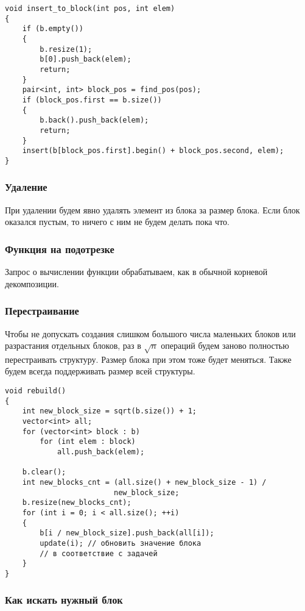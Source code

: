 \begin{verbatim}
void insert_to_block(int pos, int elem)
{
    if (b.empty())
    {
        b.resize(1);
        b[0].push_back(elem);
        return;
    }
    pair<int, int> block_pos = find_pos(pos);
    if (block_pos.first == b.size())
    {
        b.back().push_back(elem);
        return;
    }
    insert(b[block_pos.first].begin() + block_pos.second, elem);
}
\end{verbatim}

\subsubsection{Удаление}

При удалении будем явно удалять элемент из блока за размер блока. Если блок оказался пустым, то ничего с ним не будем делать пока что.

\subsubsection{Функция на подотрезке}

Запрос о вычислении функции обрабатываем, как в обычной корневой декомпозиции.

\subsubsection{Перестраивание}

Чтобы не допускать создания слишком большого числа маленьких блоков или разрастания отдельных блоков, раз в $\sqrt{n}$ операций будем заново полностью перестраивать структуру. Размер блока при этом тоже будет меняться. Также будем всегда поддерживать размер всей \mbox{структуры}.

\begin{verbatim}
void rebuild()
{
    int new_block_size = sqrt(b.size()) + 1;
    vector<int> all;
    for (vector<int> block : b)
        for (int elem : block)
            all.push_back(elem);

    b.clear();
    int new_blocks_cnt = (all.size() + new_block_size - 1) /
                         new_block_size;
    b.resize(new_blocks_cnt);
    for (int i = 0; i < all.size(); ++i)
    {
        b[i / new_block_size].push_back(all[i]);
        update(i); // обновить значение блока
        // в соответствие с задачей
    }
}
\end{verbatim}

\subsubsection{Как искать нужный блок}

